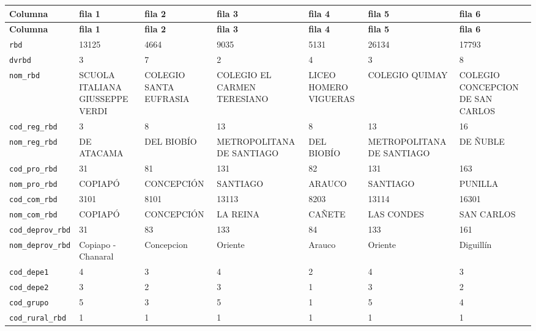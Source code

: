 \documentclass[10pt]{article}
\newcommand{\hdr}[1]{\textbf{\color{white}#1}}
\begin{document}
\footnotesize
\begin{xltabular}{\linewidth}{@{}p{4.3cm} Y Y Y Y Y Y @{}}
\hdr{Columna} & \hdr{fila 1} & \hdr{fila 2} & \hdr{fila 3} & \hdr{fila 4} & \hdr{fila 5} & \hdr{fila 6} \\
\endfirsthead
{}\hdr{Columna} & \hdr{fila 1} & \hdr{fila 2} & \hdr{fila 3} & \hdr{fila 4} & \hdr{fila 5} & \hdr{fila 6} \\
\endhead
{}\texttt{rbd} & 13125 & 4664 & 9035 & 5131 & 26134 & 17793 \\
\texttt{dvrbd} & 3 & 7 & 2 & 4 & 3 & 8 \\
\texttt{nom\_\allowbreak{}rbd} & SCUOLA ITALIANA GIUSSEPPE VERDI & COLEGIO SANTA EUFRASIA & COLEGIO EL CARMEN TERESIANO & LICEO HOMERO VIGUERAS & COLEGIO QUIMAY & COLEGIO CONCEPCION DE SAN CARLOS \\
\texttt{cod\_\allowbreak{}reg\_\allowbreak{}rbd} & 3 & 8 & 13 & 8 & 13 & 16 \\
\texttt{nom\_\allowbreak{}reg\_\allowbreak{}rbd} & DE ATACAMA & DEL BIOBÍO & METROPOLITANA DE SANTIAGO & DEL BIOBÍO & METROPOLITANA DE SANTIAGO & DE ÑUBLE \\
\texttt{cod\_\allowbreak{}pro\_\allowbreak{}rbd} & 31 & 81 & 131 & 82 & 131 & 163 \\
\texttt{nom\_\allowbreak{}pro\_\allowbreak{}rbd} & COPIAPÓ & CONCEPCIÓN & SANTIAGO & ARAUCO & SANTIAGO & PUNILLA \\
\texttt{cod\_\allowbreak{}com\_\allowbreak{}rbd} & 3101 & 8101 & 13113 & 8203 & 13114 & 16301 \\
\texttt{nom\_\allowbreak{}com\_\allowbreak{}rbd} & COPIAPÓ & CONCEPCIÓN & LA REINA & CAÑETE & LAS CONDES & SAN CARLOS \\
\texttt{cod\_\allowbreak{}deprov\_\allowbreak{}rbd} & 31 & 83 & 133 & 84 & 133 & 161 \\
\texttt{nom\_\allowbreak{}deprov\_\allowbreak{}rbd} & Copiapo -{} Chanaral & Concepcion & Oriente & Arauco & Oriente & Diguillín \\
\texttt{cod\_\allowbreak{}depe1} & 4 & 3 & 4 & 2 & 4 & 3 \\
\texttt{cod\_\allowbreak{}depe2} & 3 & 2 & 3 & 1 & 3 & 2 \\
\texttt{cod\_\allowbreak{}grupo} & 5 & 3 & 5 & 1 & 5 & 4 \\
\texttt{cod\_\allowbreak{}rural\_\allowbreak{}rbd} & 1 & 1 & 1 & 1 & 1 & 1 \\

\end{xltabular}
\end{document}

